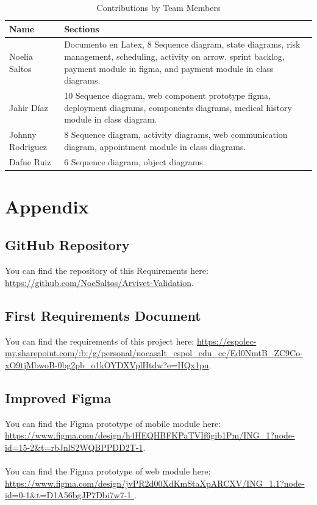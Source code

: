 \documentclass[a4paper,12pt]{report}
\begin{document}
	\begin{table}[h!]
		\centering
		\begin{tabular}{|m{4cm}|m{10cm}|}
			\hline
			\textbf{Name} & \textbf{Sections} \\ \hline
			Noelia Saltos & Documento en Latex, 8 Sequence diagram, state diagrams, risk management, scheduling, activity on arrow, sprint backlog, payment module in figma, and payment module in class diagrams. \\ \hline
			Jahir Díaz & 10 Sequence diagram, web component prototype figma, deployment diagrams, components diagrams, medical history module in class diagram. \\ \hline
			Johnny Rodriguez & 8 Sequence diagram, activity diagrams, web communication diagram, appointment module in class diagrams. \\ \hline
			Dafne Ruiz & 6 Sequence diagram, object diagrams. \\ \hline
		\end{tabular}
		\caption{Contributions by Team Members}
	\end{table}
	
	\chapter{Appendix}
	
	\section{ GitHub Repository}
	You can find the repository of this Requirements here: \url{https://github.com/NoeSaltos/Arvivet-Validation}.
	
	\section{First Requirements Document}
	You can find the requirements of this project here: \url{https://espolec-my.sharepoint.com/:b:/g/personal/noeasalt_espol_edu_ec/Ed0NmtB_ZC9Co-xO9tjMbwoB-0bg2pb_o1kOYDXVplHtdw?e=HQx1pu}.
	
	\section{Improved Figma}
	You can find the Figma prototype of mobile module here: \url{https://www.figma.com/design/h4HEQHBFKPaTVIf6gib1Pm/ING_1?node-id=15-2&t=rbJnlS2WQBPPDD2T-1}.
	\\
	\\
	You can find the Figma prototype of web module here: \url{https://www.figma.com/design/jvPR2d00XdKmStaXpARCXV/ING_1.1?node-id=0-1&t=D1A56bgJP7Dbi7w7-1  }.
	
	
	
	
	
\end{document}
